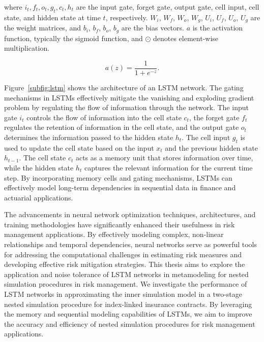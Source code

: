 where $i_t, f_t, o_t, g_t, c_t, h_t$ are the input gate, forget gate, output gate, cell input, cell state, and hidden state at time $t$, respectively.
$W_i$, $W_f$, $W_o$, $W_g$, $U_i$, $U_f$, $U_o$, $U_g$ are the weight matrices, and $b_i$, $b_f$, $b_o$, $b_g$ are the bias vectors.
$a$ is the activation function, typically the sigmoid function, and $\odot$ denotes element-wise multiplication.

\begin{equation*}
    a(z) = \frac{1}{1 + e^{-z}}.
\end{equation*}

Figure~\ref{subfig:lstm} shows the architecture of an LSTM network.
The gating mechanisms in LSTMs effectively mitigate the vanishing and exploding gradient problem by regulating the flow of information through the network.
The input gate $i_t$ controls the flow of information into the cell state $c_t$, the forget gate $f_t$ regulates the retention of information in the cell state, and the output gate $o_t$ determines the information passed to the hidden state $h_t$.
The cell input $g_t$ is used to update the cell state based on the input $x_t$ and the previous hidden state $h_{t-1}$.
The cell state $c_t$ acts as a memory unit that stores information over time, while the hidden state $h_t$ captures the relevant information for the current time step.
By incorporating memory cells and gating mechanisms, LSTMs can effectively model long-term dependencies in sequential data in finance and actuarial applications.

The advancements in neural network optimization techniques, architectures, and training methodologies have significantly enhanced their usefulness in risk management applications.
By effectively modeling complex, non-linear relationships and temporal dependencies, neural networks serve as powerful tools for addressing the computational challenges in estimating risk measures and developing effective risk mitigation strategies.
This thesis aims to explore the application and noise tolerance of LSTM networks in metamodeling for nested simulation procedures in risk management.
We investigate the performance of LSTM networks in approximating the inner simulation model in a two-stage nested simulation procedure for index-linked insurance contracts.
By leveraging the memory and sequential modeling capabilities of LSTMs, we aim to improve the accuracy and efficiency of nested simulation procedures for risk management applications.
